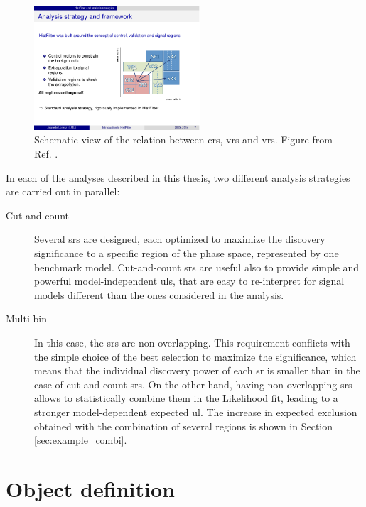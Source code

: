 \begin{figure}
\centering
\includegraphics[width=0.55\textwidth]{figures/susy_common/CR_VR}
\caption{Schematic view of the relation between \glspl{cr}, \glspl{vr} and \glspl{vr}. Figure from Ref. \cite{Baak:2014wma}.}
\label{fig:susy_common:CRschema}
\end{figure}
 
In each of the analyses described in this thesis, two different analysis strategies are carried out in parallel:
\begin{description}
\item[Cut-and-count] Several \glspl{sr} are designed, each optimized to maximize the discovery significance to a specific region of the phase space, represented by one benchmark model. Cut-and-count \glspl{sr} are useful also to provide simple and powerful model-independent \glspl{ul}, that are easy to re-interpret for signal models different than the ones considered in the analysis. 

\item[Multi-bin] In this case, the \glspl{sr} are non-overlapping. This requirement conflicts with the simple choice of the best selection to maximize the significance, which means that the individual discovery power of each \gls{sr} is smaller than in the case of cut-and-count \glspl{sr}. On the other hand, having non-overlapping \glspl{sr} allows to statistically combine them in the Likelihood fit, leading to a stronger model-dependent expected \gls{ul}. The increase in expected exclusion obtained with the combination of several regions is shown in Section \ref{sec:example_combi}.
 
\end{description}


\section{Object definition}
\label{sec:common_obj_def}

